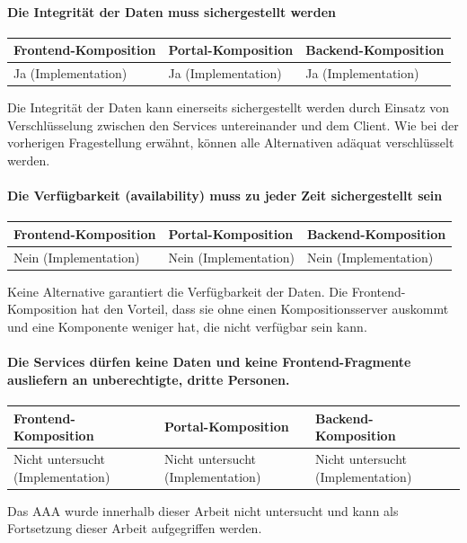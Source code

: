 \paragraph{Die Integrität der Daten muss sichergestellt werden}

\begin{tabularx}{\linewidth}{| Y | Y | Y |}
    \hline
    Frontend-Komposition & Portal-Komposition & Backend-Komposition
    \\ \hline
    Ja (Implementation) & Ja (Implementation) & Ja (Implementation) \\ \hline
\end{tabularx}

Die Integrität der Daten kann einerseits sichergestellt werden durch Einsatz von Verschlüsselung zwischen den Services untereinander und dem Client. Wie bei der vorherigen Fragestellung erwähnt, können alle Alternativen adäquat verschlüsselt werden. 

\paragraph{Die Verfügbarkeit (availability) muss zu jeder Zeit sichergestellt sein}

\begin{tabularx}{\linewidth}{| Y | Y | Y |}
    \hline
    Frontend-Komposition & Portal-Komposition & Backend-Komposition
    \\ \hline
    Nein (Implementation) & Nein (Implementation) & Nein (Implementation) \\ \hline
\end{tabularx}

Keine Alternative garantiert die Verfügbarkeit der Daten. Die Frontend-Komposition hat den Vorteil, dass sie ohne einen Kompositionsserver auskommt und eine Komponente weniger hat, die nicht verfügbar sein kann.

\paragraph{Die Services dürfen keine Daten und keine Frontend-Fragmente ausliefern an unberechtigte, dritte Personen.}

\begin{tabularx}{\linewidth}{| Y | Y | Y |}
    \hline
    Frontend-Komposition & Portal-Komposition & Backend-Komposition
    \\ \hline
    Nicht untersucht (Implementation) & Nicht untersucht (Implementation) & Nicht untersucht (Implementation) \\ \hline
\end{tabularx}

Das \ac{AAA} wurde innerhalb dieser Arbeit nicht untersucht und kann als Fortsetzung dieser Arbeit aufgegriffen werden.
